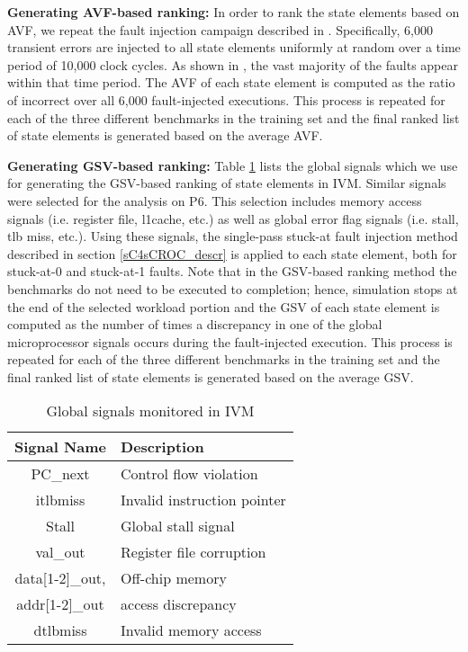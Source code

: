 \documentclass[12pt]{yalephd}
\begin{document}
{\bf Generating AVF-based ranking:} In order to rank the state elements based on AVF, we repeat the fault injection campaign described in \cite{WMP07}. Specifically, 6,000 transient errors are injected to all state elements uniformly at random over a time period of 10,000 clock cycles. As shown in \cite{maniatakos2011avf}, the vast majority of the faults appear within that time period. The AVF of each state element is computed as the ratio of incorrect over all 6,000 fault-injected executions. This process is repeated for each of the three different benchmarks in the training set and the final ranked list of state elements is generated based on the average AVF.

{\bf Generating GSV-based ranking:} Table \ref{sC4tGlobal_signals} lists the global signals which we use for generating the GSV-based ranking of state elements in IVM. Similar signals were selected for the analysis on P6. This selection includes memory access signals (i.e. register file, l1cache, etc.) as well as global error flag signals (i.e. stall, tlb miss, etc.). Using these signals, the single-pass stuck-at fault injection method described in section \ref{sC4sCROC_descr} is applied to each state element, both for stuck-at-0 and stuck-at-1 faults. Note that in the GSV-based ranking method the benchmarks do not need to be executed to completion; hence, simulation stops at the end of the selected workload portion and the GSV of each state element is computed as the number of times a discrepancy in one of the global microprocessor signals occurs during the fault-injected execution. This process is repeated for each of the three different benchmarks in the training set and the final ranked list of state elements is generated based on the average GSV.

\begin{table}[!ht]
\begin{center}
\caption{Global signals monitored in IVM}\label{sC4tGlobal_signals}
\begin{tabular}{||c|l||}
\hline
\hline
{\bf Signal Name}               & {\bf Description }      \\
\hline
PC\_next                        & Control flow violation	 \\
\hline
itlbmiss	                    & Invalid instruction pointer	 \\
\hline
Stall	                        & Global stall signal 	 \\
\hline
val\_out                        & Register file corruption \\
\hline
data[1-2]\_out, & Off-chip memory\\
addr[1-2]\_out	& access discrepancy \\
\hline
dtlbmiss	                    & Invalid memory access	 \\
\hline
\hline
\end{tabular}
\end{center}
\end{table}
\end{document}
